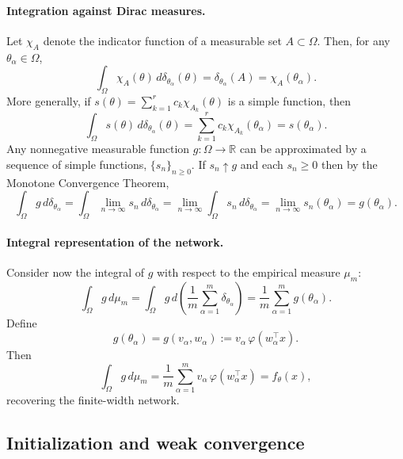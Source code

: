 \paragraph{Integration against Dirac measures.}
Let $\chi_A$ denote the indicator function of a measurable set $A \subset \Omega$.
Then, for any $\theta_\alpha \in \Omega$,
\[
	\int_\Omega \chi_A(\theta)\,d\delta_{\theta_\alpha}(\theta)
	=
	\delta_{\theta_\alpha}(A)
	=
	\chi_A(\theta_\alpha).
\]
More generally, if $s(\theta) = \sum_{k=1}^r c_k \chi_{A_k}(\theta)$ is a simple
function, then
\[
	\int_\Omega s(\theta)\,d\delta_{\theta_\alpha}(\theta)
	=
	\sum_{k=1}^r c_k \chi_{A_k}(\theta_\alpha)
	=
	s(\theta_\alpha).
\]
Any nonnegative measurable function $g : \Omega \to \mathbb{R}$ can be approximated by
a sequence of simple functions, $\{s_n\}_{n\ge 0}$. If $s_n \uparrow g$ and each $s_n \ge 0$ then
by the Monotone Convergence Theorem,
\begin{equation}
	\int_\Omega g\,d\delta_{\theta_\alpha}
	= \int_\Omega \lim_{n \to \infty} s_n\,d\delta_{\theta_\alpha}
	=  \lim_{n \to \infty} \int_\Omega s_n\,d\delta_{\theta_\alpha}
	=  \lim_{n \to \infty} s_n(\theta_\alpha)
	= g(\theta_\alpha).
	\label{eq:dirac-integration}
\end{equation}

\paragraph{Integral representation of the network.}
Consider now the integral of $g$ with respect to the empirical measure $\mu_m$:
\[
	\int_\Omega g\,d\mu_m
	=
	\int_\Omega g\,d\left(\frac{1}{m}\sum_{\alpha=1}^m \delta_{\theta_\alpha}\right)
	=
	\frac{1}{m}\sum_{\alpha=1}^m g(\theta_\alpha).
\]
Define
\[
	g(\theta_\alpha) = g(v_\alpha,w_\alpha) := v_\alpha\,\varphi(w_\alpha^\top x).
\]
Then
\begin{equation}
	\int_\Omega g\,d\mu_m
	=
	\frac{1}{m}\sum_{\alpha=1}^m v_\alpha\,\varphi(w_\alpha^\top x)
	=
	f_\theta(x),
	\label{eq:app-mf-integral-form}
\end{equation}
recovering the finite-width network.

\subsection{Initialization and weak convergence}\label{app:mf-weak-convergence}

